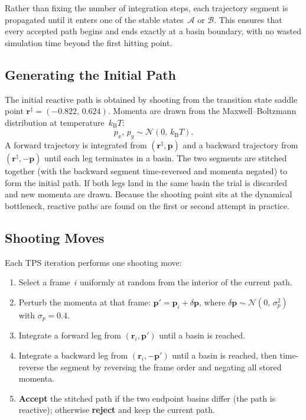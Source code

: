 \documentclass[11pt,a4paper]{article}
\begin{document}
Rather than fixing the number of integration steps, each trajectory segment is
propagated until it enters one of the stable states~$\mathcal{A}$ or
$\mathcal{B}$.  This ensures that every accepted path begins and ends exactly at
a basin boundary, with no wasted simulation time beyond the first hitting point.

\subsection{Generating the Initial Path}

The initial reactive path is obtained by shooting from the transition state
saddle point $\mathbf{r}^\ddagger = (-0.822,\, 0.624)$.  Momenta are drawn from
the Maxwell--Boltzmann distribution at temperature~$k_\mathrm{B}T$:
\begin{equation}
    p_x,\, p_y \sim \mathcal{N}(0,\, k_\mathrm{B}T).
\end{equation}
A forward trajectory is integrated from $(\mathbf{r}^\ddagger, \mathbf{p})$ and
a backward trajectory from $(\mathbf{r}^\ddagger, -\mathbf{p})$ until each leg
terminates in a basin.  The two segments are stitched together (with the
backward segment time-reversed and momenta negated) to form the initial path.
If both legs land in the same basin the trial is discarded and new momenta are
drawn.  Because the shooting point sits at the dynamical bottleneck, reactive
paths are found on the first or second attempt in practice.

\subsection{Shooting Moves}

Each TPS iteration performs one shooting move:
\begin{enumerate}
    \item Select a frame~$i$ uniformly at random from the interior of the
          current path.
    \item Perturb the momenta at that frame:
          $\mathbf{p}' = \mathbf{p}_i + \delta\mathbf{p}$,
          where $\delta\mathbf{p} \sim \mathcal{N}(0,\, \sigma_p^2)$ with
          $\sigma_p = 0.4$.
    \item Integrate a forward leg from $(\mathbf{r}_i, \mathbf{p}')$ until a
          basin is reached.
    \item Integrate a backward leg from $(\mathbf{r}_i, -\mathbf{p}')$ until a
          basin is reached, then time-reverse the segment by reversing the frame
          order and negating all stored momenta.
    \item \textbf{Accept} the stitched path if the two endpoint basins differ
          (the path is reactive); otherwise \textbf{reject} and keep the current
          path.
\end{enumerate}
\end{document}

